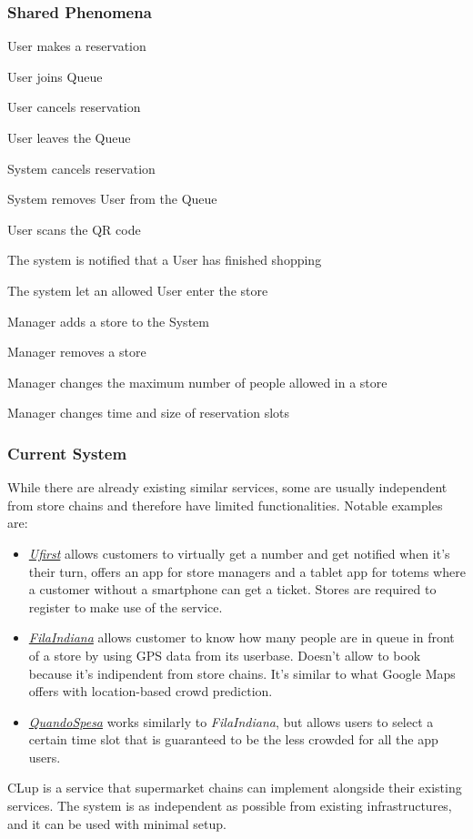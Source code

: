 \subsubsection{Shared Phenomena}
\begin{enumerate}[label={[SP\arabic*]}]
    \item User makes a reservation
    \item User joins Queue
    \item User cancels reservation
    \item User leaves the Queue
    \item System cancels reservation
    \item System removes User from the Queue
    \item User scans the QR code
    \item The system is notified that a User has finished shopping
    \item The system let an allowed User enter the store 
    \item Manager adds a store to the System
    \item Manager removes a store
    \item Manager changes the maximum number of people allowed in a store
    \item Manager changes time and size of reservation slots
\end{enumerate}

\subsubsection{Current System}
While there are already existing similar services, some are usually independent from store chains and
therefore have limited functionalities.
Notable examples are:
\begin{itemize}
    \item \href{https://www.ufirst.com}{\emph{Ufirst}} allows customers to virtually get a number
        and get notified when it's their turn, offers an app for store managers and a tablet app for totems
        where a customer without a smartphone can get a ticket. Stores are required to register to make use
        of the service.
    \item \href{https://play.google.com/store/apps/details?id=com.codaliscia}{\emph{FilaIndiana}} allows customer to
        know how many people are in queue in front of a store by using GPS data from its userbase. Doesn't allow to
        book because it's indipendent from store chains. It's similar to what Google Maps offers with location-based
        crowd prediction.
    \item \href{https://play.google.com/store/apps/details?id=it.anybot.quandospesa}{\emph{QuandoSpesa}} works similarly
        to \emph{FilaIndiana}, but allows users to select a certain time slot that is guaranteed to be the less crowded
        for all the app users.
    
\end{itemize} 
CLup is a service that supermarket chains can implement alongside their existing services. The system is as independent as possible from existing infrastructures, and it can be used with minimal setup.

